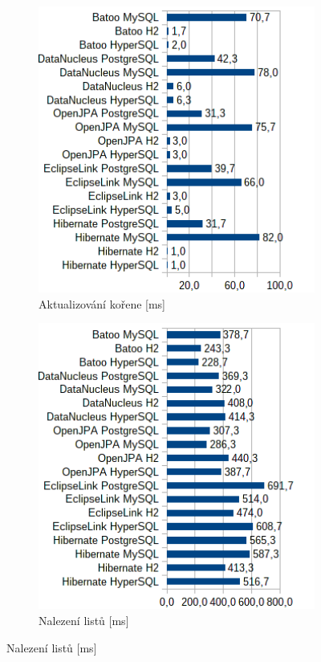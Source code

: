 \begin{figure}\ContinuedFloat
  \begin{subfigure}[b]{1\textwidth}
  \includegraphics[width=25em]{obr/bench/jpa3}
  \caption{Aktualizování kořene [ms]}\label{img:jpa3}
  \end{subfigure}
  \begin{subfigure}[b]{1\textwidth}
  \includegraphics[width=25em]{obr/bench/jpa4}
  \caption{Nalezení listů [ms]}\label{img:jpa4}
  \end{subfigure}
\end{figure}

